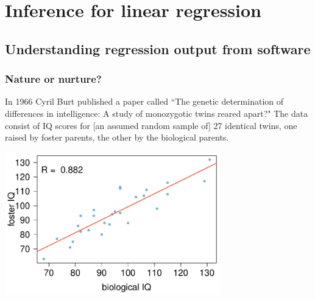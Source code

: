 \section{Inference for linear regression}


\subsection{Understanding regression output from software}


\begin{frame}
\frametitle{Nature or nurture?}

{\small In 1966 Cyril Burt published a paper called ``The genetic determination of differences in intelligence: A study of monozygotic twins reared apart?" The data consist of IQ scores for [an assumed random sample of] 27 identical twins, one raised by foster parents, the other by the biological parents.}

\begin{center}
\includegraphics[width=0.7\textwidth]{7-4_inf_lin_reg/figures/twins/twins_IQ}
\end{center}

\end{frame}


